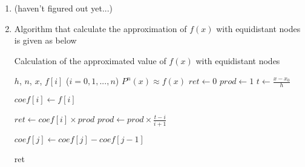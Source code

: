 \documentclass[paper=a4, fontsize=11pt]{scrartcl} %
\numberwithin{equation}{section} %
\numberwithin{figure}{section} %
\numberwithin{table}{section} %
\begin{document}
\begin{enumerate}
\begin{proof}
			\end{proof}
		\item 
			(haven't figured out yet...)
		
		\item 
		Algorithm that calculate the approximation of $f(x)$ with equidistant nodes is given as below
		
		\begin{algorithm}
			\caption{Calculation of the approximated value of $f(x)$ with equidistant nodes}
			\begin{algorithmic}[1]
				\REQUIRE $h$, $n$, $x$, $f[i]$ ($i = 0, 1, ... , n$)
				\ENSURE $P^n(x) \approx f(x)$
				\STATE $ret \gets 0$
				\STATE $prod \gets 1$
				\STATE $t \gets \frac{x-x_0}{h}$
				
					\STATE $coef[i] \gets f[i]$
				\ENDFOR
				
					\STATE $ret \gets coef[i] \times prod$
					\STATE $prod \gets prod \times \frac{t- i}{i+1}$
					
						\STATE $coef[j] \gets coef[j] - coef[j-1]$
					\ENDFOR
				\ENDFOR

				\RETURN ret
			\end{algorithmic}  
		\end{algorithm}
		
	\end{enumerate}
\end{document}
